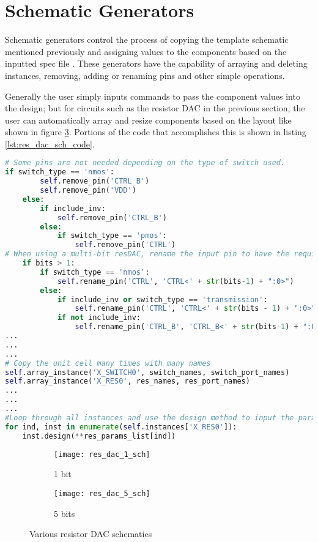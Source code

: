 \section{Schematic Generators}
Schematic generators control the process of copying the template schematic mentioned previously and assigning values to the components based on the inputted spec file \cite{chang_bag2:_2018}. These generators have the capability of arraying and deleting instances, removing, adding or renaming pins and other simple operations.

Generally the user simply inputs commands to pass the component values into the design; but for circuits such as the resistor DAC in the previous section, the user can automatically array and resize components based on the layout like shown in figure \ref{fig:resdac_sch}. Portions of the code that accomplishes this is shown in listing \ref{lst:res_dac_sch_code}.
\begin{lstlisting}[language=Python, caption=Resistor DAC schematic generator, label={lst:res_dac_sch_code}, float]
# Some pins are not needed depending on the type of switch used.
if switch_type == 'nmos':
        self.remove_pin('CTRL_B')
        self.remove_pin('VDD')
    else:
        if include_inv:
            self.remove_pin('CTRL_B')
        else:
            if switch_type == 'pmos':
                self.remove_pin('CTRL')
# When using a multi-bit resDAC, rename the input pin to have the required bitwidth.
    if bits > 1:
        if switch_type == 'nmos':
            self.rename_pin('CTRL', 'CTRL<' + str(bits-1) + ":0>")
        else:
            if include_inv or switch_type == 'transmission':
                self.rename_pin('CTRL', 'CTRL<' + str(bits - 1) + ":0>")
            if not include_inv:
                self.rename_pin('CTRL_B', 'CTRL_B<' + str(bits-1) + ":0>")
...
...
...
# Copy the unit cell many times with many names
self.array_instance('X_SWITCH0', switch_names, switch_port_names)
self.array_instance('X_RES0', res_names, res_port_names)
...
...
...
#Loop through all instances and use the design method to input the params from the spec file into the schematic
for ind, inst in enumerate(self.instances['X_RES0']):
	inst.design(**res_params_list[ind])
\end{lstlisting}
\clearpage
\begin{figure}[h]
\centering
\begin{subfigure}{.5\linewidth}
  \centering
  \texttt{[image: res\_dac\_1\_sch]}
  \caption{1 bit}
  \label{fig:sfig1}
\end{subfigure}
\begin{subfigure}{0.6\linewidth}
  \centering
\texttt{[image: res\_dac\_5\_sch]}
  \caption{5 bits}
  \label{fig:sfig2}
\end{subfigure}
\caption{Various resistor DAC schematics}
\label{fig:resdac_sch}
\end{figure}
\clearpage
